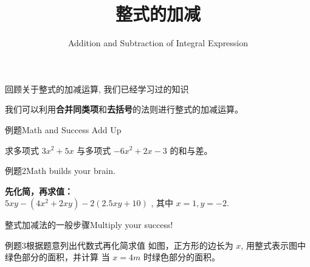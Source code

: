 
\usepackage{smartdiagram}
\usepackage{bm}

\title{整式的加减}
\subtitle{Addition and Subtraction of Integral Expression}


    \frame{\titlepage}

    \begin{frame}{回顾}{关于整式的加减运算, 我们已经学习过的知识}
        \begin{figure}
            \centering
        \end{figure}
        

        我们可以利用\textbf{合并同类项}和\textbf{去括号}的法则进行整式的加减运算。
    \end{frame}

    \begin{frame}{例题}{Math and Success Add Up}
        \begin{block}{}
        求多项式 $3x^2+5x$ 与多项式 $-6x^2+2x-3$ 的和与差。
        \end{block}
    \end{frame}

    \begin{frame}{例题2}{Math builds your brain.}
        \begin{block}{}
        \textbf{先化简，再求值：} \\
        $5xy-(4x^2+2xy)-2(2.5xy+10)$ , 其中 $x=1, y=-2$.
        \end{block}
    \end{frame}

    \begin{frame}{整式加减法的一般步骤}{Multiply your success!}
        \begin{figure}
            \centering
        \end{figure}
        
    \end{frame}

    \begin{frame}{例题3}{根据题意列出代数式再化简求值}
        如图，正方形的边长为 $x$, 用整式表示图中绿色部分的面积，并计算
        当 $x=4m$ 时绿色部分的面积。
        \begin{figure}
        \end{figure}
    \end{frame}
